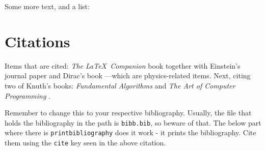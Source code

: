 \documentclass[10pt,a4paper]{article}
\begin{document}
Some more text, and a list:

\blindenumerate



\section{Citations}
Items that are cited: \textit{The \LaTeX\ Companion} book \cite{latexcompanion} together with Einstein's journal paper \cite{einstein} and Dirac's book \cite{dirac}---which are physics-related items. Next, citing two of Knuth's books: \textit{Fundamental Algorithms} \cite{knuth-fa} and \textit{The Art of Computer Programming} \cite{knuthwebsite}.


Remember to change this to your respective bibliography. Usually, the file that holds the bibliography in the path is \texttt{bibb.bib}, so beware of that. The below part where there is \texttt{printbibliography} does it work - it prints the bibliography. Cite them using the \texttt{cite} key seen in the above citation. 

\medskip

\printbibliography %
\end{document}
